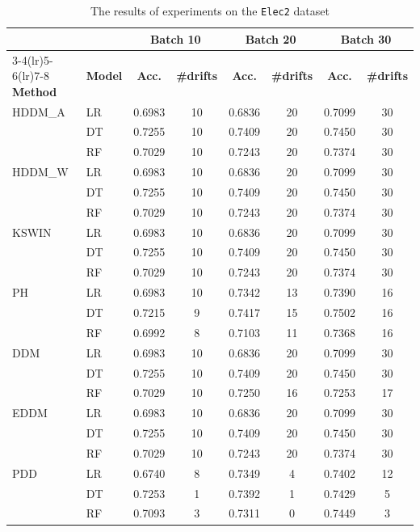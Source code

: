 \documentclass[pdflatex,sn-mathphys-ay]{sn-jnl}%
\theoremstyle{thmstyleone}%
\theoremstyle{thmstyletwo}%
\theoremstyle{thmstylethree}%
\begin{document}
\begin{table}[h]
    \centering
    \scriptsize
    \caption{The results of experiments on the \texttt{Elec2} dataset}
    \label{tab:exp_Elec2}
    \begin{tabular}{llcccccc}\toprule
         & & \multicolumn{2}{c}{Batch 10} & \multicolumn{2}{c}{Batch 20} & \multicolumn{2}{c}{Batch 30} \\\cmidrule(lr){3-4}\cmidrule(lr){5-6}\cmidrule(lr){7-8}
         \textbf{Method} & \textbf{Model} & \textbf{Acc.} & \textbf{\#drifts} & \textbf{Acc.} & \textbf{\#drifts} & \textbf{Acc.} & \textbf{\#drifts} \\\midrule
    HDDM\_A & LR & 0.6983 & 10 & 0.6836 & 20 & 0.7099 & 30 \\
           & DT & 0.7255 & 10 & 0.7409 & 20 & 0.7450 & 30 \\
           & RF & 0.7029 & 10 & 0.7243 & 20 & 0.7374 & 30 \\\midrule
    HDDM\_W & LR & 0.6983 & 10 & 0.6836 & 20 & 0.7099 & 30 \\
           & DT & 0.7255 & 10 & 0.7409 & 20 & 0.7450 & 30 \\
           & RF & 0.7029 & 10 & 0.7243 & 20 & 0.7374 & 30 \\\midrule
    KSWIN   & LR & 0.6983 & 10 & 0.6836 & 20 & 0.7099 & 30 \\
           & DT & 0.7255 & 10 & 0.7409 & 20 & 0.7450 & 30 \\
           & RF & 0.7029 & 10 & 0.7243 & 20 & 0.7374 & 30 \\\midrule
    PH & LR & 0.6983 & 10 & 0.7342 & 13 & 0.7390 & 16 \\
                & DT & 0.7215 & 9  & 0.7417 & 15 & 0.7502 & 16 \\
                & RF & 0.6992 & 8  & 0.7103 & 11 & 0.7368 & 16 \\\midrule
    DDM     & LR & 0.6983 & 10 & 0.6836 & 20 & 0.7099 & 30 \\
            & DT & 0.7255 & 10 & 0.7409 & 20 & 0.7450 & 30 \\
            & RF & 0.7029 & 10 & 0.7250 & 16 & 0.7253 & 17 \\\midrule
    EDDM    & LR & 0.6983 & 10 & 0.6836 & 20 & 0.7099 & 30 \\
            & DT & 0.7255 & 10 & 0.7409 & 20 & 0.7450 & 30 \\
            & RF & 0.7029 & 10 & 0.7243 & 20 & 0.7374 & 30 \\\midrule
    PDD     & LR & 0.6740 & 8  & 0.7349 & 4  & 0.7402 & 12 \\
            & DT & 0.7253 & 1  & 0.7392 & 1  & 0.7429 & 5  \\
            & RF & 0.7093 & 3  & 0.7311 & 0  & 0.7449 & 3  \\\bottomrule
    \end{tabular}
\end{table}
\end{document}
